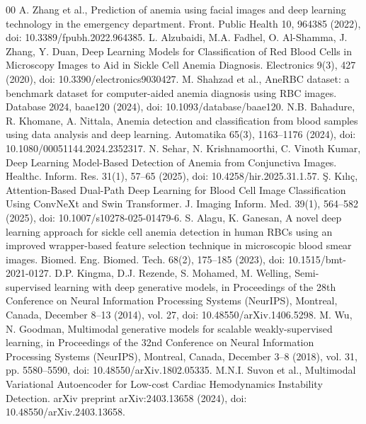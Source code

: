 \documentclass[conference,letterpaper]{IEEEtran}
\begin{document}
\FloatBarrier
\begin{thebibliography}{00}
 A. Zhang et al., Prediction of anemia using facial images and deep learning technology in the emergency department. Front. Public Health 10, 964385 (2022), doi: 10.3389/fpubh.2022.964385.
 L. Alzubaidi, M.A. Fadhel, O. Al-Shamma, J. Zhang, Y. Duan, Deep Learning Models for Classification of Red Blood Cells in Microscopy Images to Aid in Sickle Cell Anemia Diagnosis. Electronics 9(3), 427 (2020), doi: 10.3390/electronics9030427.
 M. Shahzad et al., AneRBC dataset: a benchmark dataset for computer-aided anemia diagnosis using RBC images. Database 2024, baae120 (2024), doi: 10.1093/database/baae120.
 N.B. Bahadure, R. Khomane, A. Nittala, Anemia detection and classification from blood samples using data analysis and deep learning. Automatika 65(3), 1163--1176 (2024), doi: 10.1080/00051144.2024.2352317.
 N. Sehar, N. Krishnamoorthi, C. Vinoth Kumar, Deep Learning Model-Based Detection of Anemia from Conjunctiva Images. Healthc. Inform. Res. 31(1), 57--65 (2025), doi: 10.4258/hir.2025.31.1.57.
 \c{S}. K{\i}l{\i}\c{c}, Attention-Based Dual-Path Deep Learning for Blood Cell Image Classification Using ConvNeXt and Swin Transformer. J. Imaging Inform. Med. 39(1), 564--582 (2025), doi: 10.1007/s10278-025-01479-6.
 S. Alagu, K. Ganesan, A novel deep learning approach for sickle cell anemia detection in human RBCs using an improved wrapper-based feature selection technique in microscopic blood smear images. Biomed. Eng. Biomed. Tech. 68(2), 175--185 (2023), doi: 10.1515/bmt-2021-0127.
 D.P. Kingma, D.J. Rezende, S. Mohamed, M. Welling, Semi-supervised learning with deep generative models, in Proceedings of the 28th Conference on Neural Information Processing Systems (NeurIPS), Montreal, Canada, December 8--13 (2014), vol. 27, doi: 10.48550/arXiv.1406.5298.
 M. Wu, N. Goodman, Multimodal generative models for scalable weakly-supervised learning, in Proceedings of the 32nd Conference on Neural Information Processing Systems (NeurIPS), Montreal, Canada, December 3--8 (2018), vol. 31, pp. 5580--5590, doi: 10.48550/arXiv.1802.05335.
 M.N.I. Suvon et al., Multimodal Variational Autoencoder for Low-cost Cardiac Hemodynamics Instability Detection. arXiv preprint arXiv:2403.13658 (2024), doi: 10.48550/arXiv.2403.13658.
\end{thebibliography}
\end{document}
